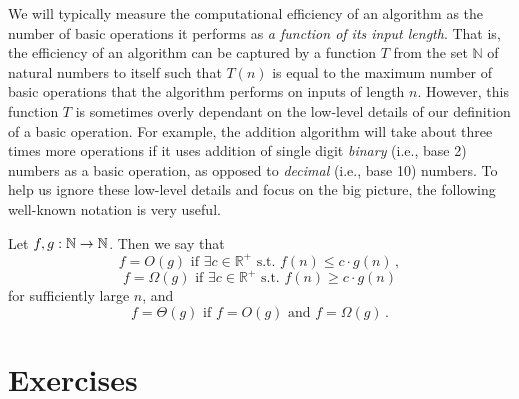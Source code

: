 We will typically measure the computational efficiency of an algorithm as the number of basic operations it performs as \emph{a function of its input length}. That is, the efficiency of an algorithm can be captured by a function $T$ from the set $\mathbb{N}$ of natural numbers to itself such that $T(n)$ is equal to the maximum number of basic operations that the algorithm performs on inputs of length $n$. However, this function $T$ is sometimes overly dependant on the low-level details of our definition of a basic operation. For example, the addition algorithm will take about three times more operations if it uses addition of single digit \emph{binary} (i.e., base 2) numbers as a basic operation, as opposed to \emph{decimal} (i.e., base 10) numbers. To help us ignore these low-level details and focus on the big picture, the following well-known notation is very useful.
\begin{definition}
	Let $f,g : \mathbb{N} \to \mathbb{N}$. Then we say that
	\begin{equation}
		f = O(g) \text{ if } \exists c \in \mathbb{R^+} \text{ s.t. } f(n) \le c \cdot g(n) \, ,
	\end{equation}
	\begin{equation}
		f = \Omega(g) \text{ if } \exists c \in \mathbb{R^+} \text{ s.t. } f(n) \ge c \cdot g(n)
	\end{equation}
	for sufficiently large $n$, and
	\begin{equation}
		f = \Theta(g) \text{ if } f= O (g) \text{ and } f = \Omega(g) \, .
	\end{equation}
\end{definition}

\section*{Exercises}


